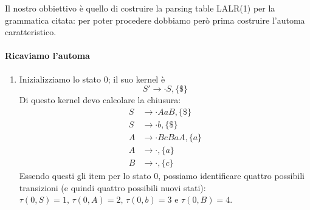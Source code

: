 \documentclass[class=book, crop=false, oneside, 12pt]{standalone}
\begin{document}
Il nostro obbiettivo è quello di costruire la parsing table LALR(1) per la grammatica citata: per poter procedere dobbiamo però prima costruire l'automa caratteristico.
\paragraph{Ricaviamo l'automa}
\begin{enumerate}
    \item Inizializziamo lo stato 0; il suo kernel è 
    \begin{equation*}
        S' \to \cdot S, \{\$\}
    \end{equation*}
    Di questo kernel devo calcolare la chiusura:
    \begin{align*}
        S &\to \cdot AaB, \{\$\} \\
        S &\to \cdot b, \{\$\} \\
        A &\to \cdot BcBaA, \{a\} \\
        A &\to \cdot, \{a\} \\
        B &\to \cdot, \{c\}
    \end{align*}
    Essendo questi gli item per lo stato 0, possiamo identificare quattro possibili transizioni (e quindi quattro possibili nuovi stati): \(\tau(0,S)=1 \textrm{, } \tau(0,A)=2 \textrm{, } \tau(0,b)=3 \textrm{ e } \tau(0,B)=4\).
    

\end{enumerate}
\end{document}

